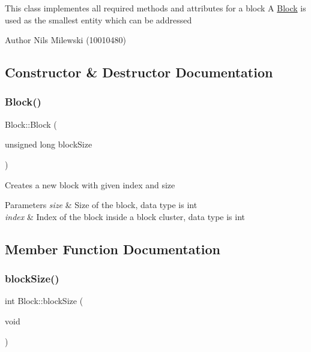 This class implementes all required methods and attributes for a block A \mbox{\hyperlink{classcore_1_1logic_1_1_block}{Block}} is used as the smallest entity which can be addressed \begin{DoxyAuthor}{Author}
Nils Milewski (10010480) 
\end{DoxyAuthor}


\subsection{Constructor \& Destructor Documentation}
\mbox{\label{classcore_1_1logic_1_1_block_a893088c60b4c0c41370eb5df87b566d0}} 
\subsubsection{\texorpdfstring{Block()}{Block()}}
{\footnotesize\ttfamily Block\+::\+Block (\begin{DoxyParamCaption}\item[{unsigned long}]{block\+Size }\end{DoxyParamCaption})}

Creates a new block with given index and size


\begin{DoxyParams}{Parameters}
{\em size} & Size of the block, data type is int\\
\hline
{\em index} & Index of the block inside a block cluster, data type is int \\
\hline
\end{DoxyParams}


\subsection{Member Function Documentation}
\mbox{\label{classcore_1_1logic_1_1_block_a0b57337ab5b3817a6509efd1a323c3eb}} 
\subsubsection{\texorpdfstring{block\+Size()}{blockSize()}}
{\footnotesize\ttfamily int Block\+::block\+Size (\begin{DoxyParamCaption}\item[{void}]{ }\end{DoxyParamCaption})}

